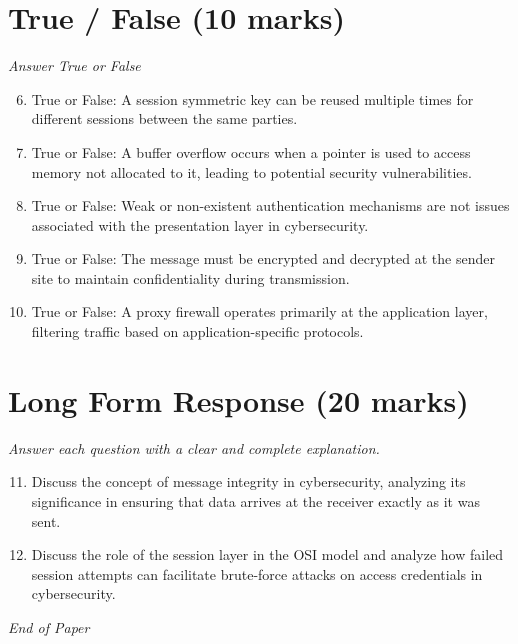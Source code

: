 \documentclass[12pt]{article}
\begin{document}
\section*{True / False (10 marks)}
\textit{Answer True or False}
\begin{enumerate}[label=\arabic*.]
\setcounter{enumi}{5}
\item True or False: A session symmetric key can be reused multiple times for different sessions between the same parties.
\item True or False: A buffer overflow occurs when a pointer is used to access memory not allocated to it, leading to potential security vulnerabilities.
\item True or False: Weak or non-existent authentication mechanisms are not issues associated with the presentation layer in cybersecurity.
\item True or False: The message must be encrypted and decrypted at the sender site to maintain confidentiality during transmission.
\item True or False: A proxy firewall operates primarily at the application layer, filtering traffic based on application-specific protocols.
\end{enumerate}

\section*{Long Form Response (20 marks)}
\textit{Answer each question with a clear and complete explanation.}
\begin{enumerate}[label=\arabic*.]
\setcounter{enumi}{10}
\item Discuss the concept of message integrity in cybersecurity, analyzing its significance in ensuring that data arrives at the receiver exactly as it was sent.
\item Discuss the role of the session layer in the OSI model and analyze how failed session attempts can facilitate brute-force attacks on access credentials in cybersecurity.
\end{enumerate}

\vfill
\noindent\textit{End of Paper}
\end{document}
